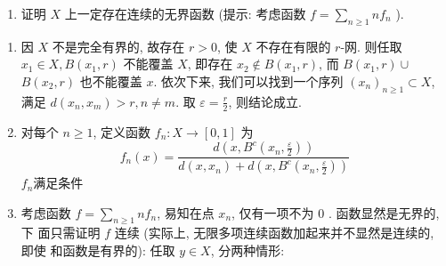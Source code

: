 \begin{enumerate}
\begin{enumerate}
                \item 证明 $X$ 上一定存在连续的无界函数 (提示: 考虑函数 $f=\sum_{n \geq 1} n f_{n}$ ).
            \end{enumerate}
            \begin{answer}
                \begin{enumerate}
                    \item 因 $X$ 不是完全有界的, 故存在 $r>0$, 使 $X$ 不存在有限的 $r$-网.
                    则任取 $x_{1} \in X, B\left(x_{1}, r\right)$ 不能覆盖 $X$, 即存在 $x_{2} \notin B\left(x_{1}, r\right)$, 而 $B\left(x_{1}, r\right) \cup$ $B\left(x_{2}, r\right)$ 也不能覆盖 $x$. 依次下来, 我们可以找到一个序列 $\left(x_{n}\right)_{n \geq 1} \subset X$, 满足 $d\left(x_{n}, x_{m}\right)>r, n \neq  m$. 取 $\varepsilon=\frac{r}{2}$, 则结论成立.
                    \item 对每个 $n \geq 1$, 定义函数 $f_{n}: X \rightarrow[0,1]$ 为
                    \[
                    f_{n}(x)=\frac{d\left(x, B^{c}\left(x_{n}, \frac{\varepsilon}{2}\right)\right)}{d\left(x, x_{n}\right)+d\left(x, B^{c}\left(x_{n}, \frac{\varepsilon}{2}\right)\right)}
                    \]
                    $f_n$满足条件
                    \item 考虑函数 $f=\sum_{n \geq 1} n f_{n}$, 易知在点 $x_{n}$, 仅有一项不为 0 . 函数显然是无界的, 下 面只需证明 $f$ 连续 (实际上, 无限多项连续函数加起来并不显然是连续的, 即使 和函数是有界的):
                    任取 $y \in X$, 分两种情形:    
                \end{enumerate}
            \end{answer}

\end{enumerate}
